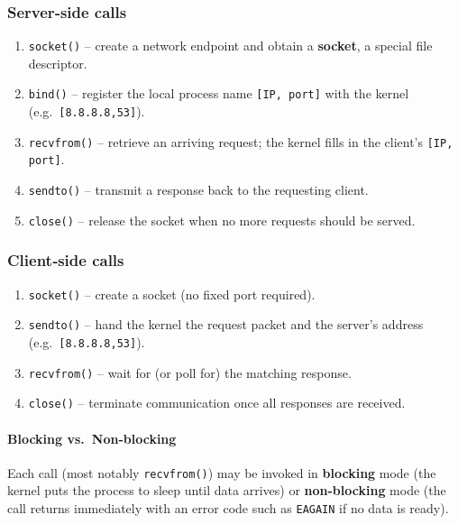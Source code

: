 \documentclass[../../compsys.tex]{subfiles}
\begin{document}
\subsubsection{Server‐side calls}
\begin{enumerate}
  \item \texttt{socket()} – create a network endpoint and obtain a \textbf{socket}, a special file descriptor.
  \item \texttt{bind()} – register the local process name \texttt{[IP,\,port]} with the kernel (e.g.\ \texttt{[8.8.8.8,53]}).
  \item \texttt{recvfrom()} – retrieve an arriving request; the kernel fills in the client's \texttt{[IP,\,port]}.
  \item \texttt{sendto()} – transmit a response back to the requesting client.
  \item \texttt{close()} – release the socket when no more requests should be served.
\end{enumerate}

\subsubsection{Client‐side calls}
\begin{enumerate}
  \item \texttt{socket()} – create a socket (no fixed port required).
  \item \texttt{sendto()} – hand the kernel the request packet and the server's address (e.g.\ \texttt{[8.8.8.8,53]}).
  \item \texttt{recvfrom()} – wait for (or poll for) the matching response.
  \item \texttt{close()} – terminate communication once all responses are received.
\end{enumerate}

\paragraph{Blocking vs.\ Non-blocking}  Each call (most notably \texttt{recvfrom()}) may be invoked in \textbf{blocking} mode (the kernel puts the process to sleep until data arrives) or \textbf{non-blocking} mode (the call returns immediately with an error code such as \texttt{EAGAIN} if no data is ready).\\[15px]
\end{document}
